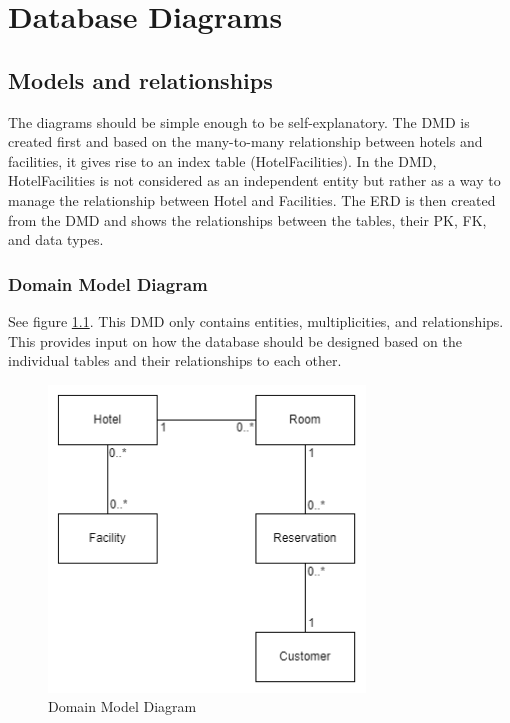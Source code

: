 \chapter{Database Diagrams}
\label{chapter:diagrams}

\section{Models and relationships}
The diagrams should be simple enough to be self-explanatory. The DMD is created first and based on the many-to-many relationship between hotels and facilities, it gives rise to an index table (HotelFacilities).
In the DMD, HotelFacilities is not considered as an independent entity but rather as a way to manage the relationship between Hotel and Facilities.
The ERD is then created from the DMD and shows the relationships between the tables, their PK, FK, and data types.

\subsection{Domain Model Diagram}
See figure \ref*{fig:domain-model-diagram}. 
This DMD only contains entities, multiplicities, and relationships.
This provides input on how the database should be designed based on the individual tables and their relationships to each other.

\begin{figure}
  \centering
  \includegraphics[width=0.75\textwidth]{figures/SWD_Domain_HotelManagement.png}
  \caption{Domain Model Diagram}
  \label{fig:domain-model-diagram}
\end{figure}

